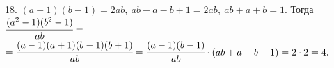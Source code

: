18. $(a-1)(b-1)=2ab,\ ab-a-b+1=2ab,\ ab+a+b=1.$ Тогда $\cfrac{(a^2-1)(b^2-1)}{ab}=$\\$=\cfrac{(a-1)(a+1)(b-1)(b+1)}{ab}=\cfrac{(a-1)(b-1)}{ab}\cdot(ab+a+b+1)=2\cdot2=4.$\\
